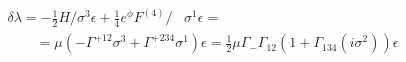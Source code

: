 \begin{equation}
\begin{array}{l}
 \delta \lambda = - \frac{1}{2} H \!\!\!\! /  \sigma^3 \epsilon +
   \frac{1}{4} e^\phi F^{(4)} \!\!\!\!\!\!\!\!\! / \,\,\,\,\, \sigma^1 \epsilon =
    \\
\qquad
= \mu \left( -  \Gamma^{+12} \sigma^3 +  \Gamma^{+234} \sigma^1 \right) \epsilon  =
\frac{1}{2} \mu \Gamma_- \Gamma_{12} \left( 1 + \Gamma_{134} (i \sigma^2) \right) \epsilon
\end{array}
\end{equation}

